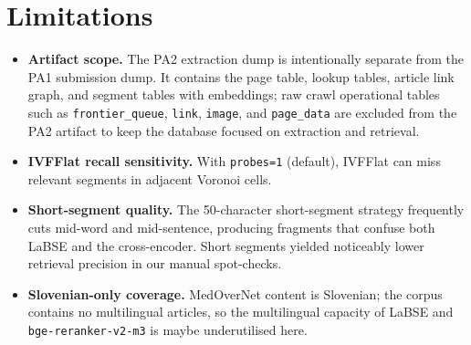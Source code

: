 \documentclass[9pt]{IEEEtran}
\begin{document}
\section{Limitations}
\label{sec:limitations}
\begin{itemize}
    \item \textbf{Artifact scope.} The PA2 extraction dump is intentionally separate from the PA1 submission dump. It contains the page table, lookup tables, article link graph, and segment tables with embeddings;
    raw crawl operational tables such as \texttt{frontier\_queue}, \texttt{link}, \texttt{image}, and \texttt{page\_data} are excluded from the PA2 artifact to keep the database focused on extraction and retrieval.
    \item \textbf{IVFFlat recall sensitivity.} With \texttt{probes=1} (default), IVFFlat can miss relevant segments in adjacent Voronoi cells.
    \item \textbf{Short-segment quality.} The 50-character short-segment strategy frequently cuts mid-word and mid-sentence, producing fragments that confuse both LaBSE and the cross-encoder. Short segments yielded noticeably lower retrieval precision in our manual spot-checks.
    \item \textbf{Slovenian-only coverage.} MedOverNet content is Slovenian; the corpus contains no multilingual articles, so the multilingual capacity of LaBSE and \texttt{bge-reranker-v2-m3} is maybe underutilised here.
\end{itemize}
\end{document}
